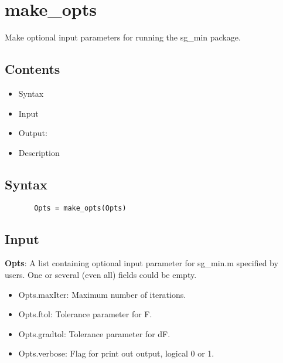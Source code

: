 \documentclass[a4paper,11pt,openany]{memoir}
\begin{document}
\newpage 

\rmfamily
\color{black}\section{make\_opts}

\begin{par}
Make optional input parameters for running the sg\_min package.
\end{par} \vspace{1em}

\subsection*{Contents}

\begin{itemize}
\setlength{\itemsep}{-1ex}
   \item Syntax
   \item Input
   \item Output:
   \item Description
\end{itemize}


\subsection*{Syntax}


\begin{verbatim}       Opts = make_opts(Opts)\end{verbatim}
    

\subsection*{Input}

\begin{par}
\textbf{Opts}: A list containing optional input parameter for sg\_min.m specified by users.  One or several (even all) fields could be empty.
\end{par} \vspace{1em}
\begin{itemize}
\setlength{\itemsep}{-1ex}
   \item Opts.maxIter: Maximum number of iterations.
   \item Opts.ftol: Tolerance parameter for F.
   \item Opts.gradtol: Tolerance parameter for dF.
   \item Opts.verbose: Flag for print out output, logical 0 or 1.
\end{itemize}
\end{document}
